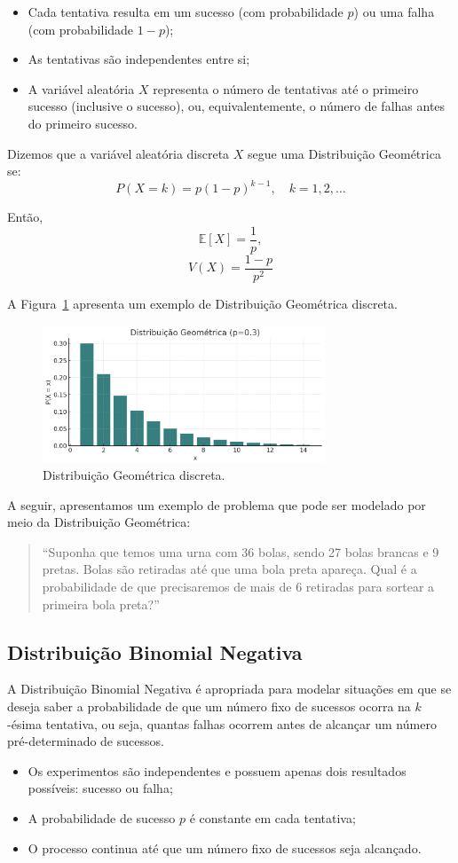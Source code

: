 \documentclass{article}
\begin{document}
\begin{itemize}
    \item Cada tentativa resulta em um sucesso (com probabilidade $p$) ou uma falha (com probabilidade $1 - p$);
    \item As tentativas são independentes entre si;
    \item A variável aleatória $X$ representa o número de tentativas até o primeiro sucesso (inclusive o sucesso), ou, equivalentemente, o número de falhas antes do primeiro sucesso.
\end{itemize}

Dizemos que a variável aleatória discreta $X$ segue uma Distribuição Geométrica se:
    $$
    P(X = k) = p(1 - p)^{k - 1}, \quad k = 1, 2, \ldots
    $$

Então,
    $$
    \mathbb{E}[X] = \frac{1}{p},
    $$
    $$
    V(X) = \frac{1 - p}{p^2}
    $$

A Figura~\ref{fig:dist_disc_geometrica} apresenta um exemplo de Distribuição Geométrica discreta.

\begin{figure}[H]
    \centering
    \includegraphics[width=0.75\textwidth]{figuras/dist_disc_geometrica.png}
    \caption{Distribuição Geométrica discreta.}
    \label{fig:dist_disc_geometrica}
\end{figure}

A seguir, apresentamos um exemplo de problema que pode ser modelado por meio da Distribuição Geométrica:
\begin{quote}
``Suponha que temos uma urna com 36 bolas, sendo 27 bolas brancas e 9 pretas. Bolas são retiradas até que uma bola preta apareça. Qual é a probabilidade de que precisaremos de mais de 6 retiradas para sortear a primeira bola preta?''
\end{quote}

\subsection{Distribuição Binomial Negativa}
A Distribuição Binomial Negativa é apropriada para modelar situações em que se deseja saber a probabilidade de que um número fixo de sucessos ocorra na $k$-ésima tentativa, ou seja, quantas falhas ocorrem antes de alcançar um número pré-determinado de sucessos.
\begin{itemize}
    \item Os experimentos são independentes e possuem apenas dois resultados possíveis: sucesso ou falha;
    \item A probabilidade de sucesso $p$ é constante em cada tentativa;
    \item O processo continua até que um número fixo de sucessos seja alcançado.
\end{itemize}
\end{document}
